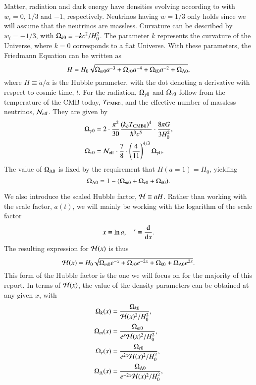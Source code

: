 Matter, radiation and dark energy have densities evolving according to  with $w_i=0,\,1/3$ and $-1$, respectively. Neutrinos having $w=1/3$ only holds since we will assume that the neutrinos are massless. Curvature can be described by $w_i=-1/3$, with $\Omega_{k0}\equiv -kc^2/H_0^2$. The parameter $k$ represents the curvature of the Universe, where $k=0$ corresponds to a flat Universe. With these parameters, the Friedmann Equation can be written as \citep[Eq. (3.14)]{Dodelson}  
\begin{equation}
    H = H_0 \sqrt{\Omega_{m0} a^{-3} + \Omega_{r0} a^{-4} + \Omega_{k0} a^{-2} + \Omega_{\Lambda 0}}, \label{eq:M1:theory:Friedmann_H_omegas}
\end{equation}
where $H\equiv\dot{a}/a$ is the Hubble parameter, with the dot denoting a derivative with respect to cosmic time, $t$. For the radiation, $\Omega_{\gamma 0}$ and $\Omega_{\nu 0}$ follow from the temperature of the CMB today, $T_\mathrm{CMB0}$, and the effective number of massless neutrinos, $\mathcal{N}_\mathrm{eff}$. They are given by 
\begin{align}
    \Omega_{\gamma 0} &= 2 \cdot \frac{\pi^2}{30} \frac{(k_b T_\mathrm{CMB0})^4}{\hbar^3 c^5} \cdot \frac{8\pi G}{3H_0^2}, \label{eq:M1:theory:omega_gamma0_T} \\
    \Omega_{\nu 0} &= \mathcal{N}_\mathrm{eff} \cdot \frac{7}{8} \cdot \left( \frac{4}{11} \right)^{4/3} \Omega_{\gamma 0}. \label{eq:M1:theory:omega_nu0_T}
\end{align}
%
%
The value of $\Omega_{\Lambda 0}$ is fixed by the requirement that $H(a=1)=H_0$, yielding 
\begin{equation}
    \Omega_{\Lambda 0} = 1 - (\Omega_{m0} + \Omega_{r0} + \Omega_{k0}). \label{eq:M1:theory:omega_lambda_0_normalization_condition}
\end{equation}
%

We also introduce the scaled Hubble factor, $\mathcal{H}\equiv aH$. Rather than working with the scale factor, $a(t)$, we will mainly be working with the logarithm of the scale factor 
\begin{equation} \label{eq:M1:theory:x_dx_definitions}
    x\equiv \ln a,\quad '\equiv \dv{x}. 
\end{equation}
%
The resulting expression for $\mathcal{H}(x)$ is thus  
\begin{equation} \label{eq:M1:theory:Hp_of_x}
    \mathcal{H}(x) = H_0 \sqrt{\Omega_{m0} e^{-x} + \Omega_{r0} e^{-2x} + \Omega_{k0} + \Omega_{\Lambda 0} e^{2x}}. 
\end{equation}
%
This form of the Hubble factor is the one we will focus on for the majority of this report. In terms of $\mathcal{H}(x)$, the value of the density parameters can be obtained at any given $x$, with 
\begin{align}
    \Omega_{k}(x) &= \frac{\Omega_{k0}}{\mathcal{H}(x)^2 / H_0^2}, \label{eq:M1:theory:omega_k_of_x}\\ 
    \Omega_{m}(x) &= \frac{\Omega_{m0}}{e^x \mathcal{H}(x)^2 / H_0^2}, \label{eq:M1:theory:omega_m_of_x}\\ 
    \Omega_{r}(x) &= \frac{\Omega_{r0}}{e^{2x} \mathcal{H}(x)^2 / H_0^2}, \label{eq:M1:theory:omega_r_of_x}\\ 
    \Omega_{\Lambda}(x) &= \frac{\Omega_{\Lambda 0}}{e^{-2x} \mathcal{H}(x)^2 / H_0^2}, \label{eq:M1:theory:omega_L_of_x}    
\end{align}

